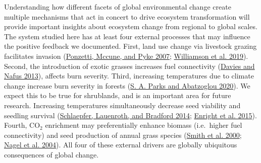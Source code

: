 \documentclass[
  12pt,
]{article}
\begin{document}
Understanding how different facets of global environmental change create
multiple mechanisms that act in concert to drive ecosystem
transformation will provide important insights about ecosystem change
from regional to global scales. The system studied here has at least
four external processes that may influence the positive feedback we
documented. First, land use change via livestock grazing facilitates
invasion (\protect\hyperlink{ref-Ponzetti2007}{Ponzetti, Mccune, and
Pyke 2007}; \protect\hyperlink{ref-Williamson2019}{Williamson et al.
2019}). Second, the introduction of exotic grasses increases fuel
connectivity (\protect\hyperlink{ref-Davies2013}{Davies and Nafus
2013}), affects burn severity. Third, increasing temperatures due to
climate change increase burn severity in forests
(\protect\hyperlink{ref-Parks2020}{S. A. Parks and Abatzoglou 2020}). We
expect this to be true for shrublands, and is an important area for
future research. Increasing temperatures simultaneously decrease seed
viability and seedling survival
(\protect\hyperlink{ref-Schlaepfer2014}{Schlaepfer, Lauenroth, and
Bradford 2014}; \protect\hyperlink{ref-Enright2015}{Enright et al.
2015}). Fourth, CO\(_2\) enrichment may preferentially enhance biomass
(i.e.~higher fuel connectivity) and seed production of annual grass
species (\protect\hyperlink{ref-Smith2000}{Smith et al. 2000};
\protect\hyperlink{ref-Nagel2004}{Nagel et al. 2004}). All four of these
external drivers are globally ubiquitous consequences of global change.
\end{document}
